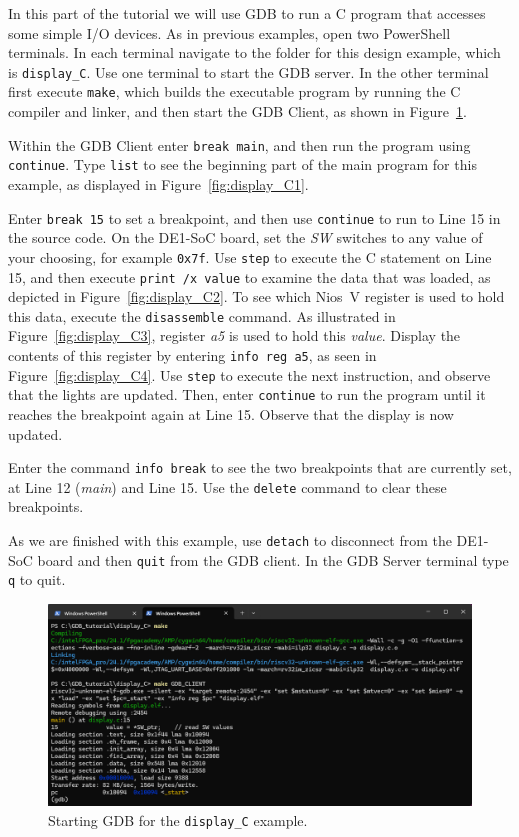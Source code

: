 \documentclass[11pt, twoside, pdftex]{article}
\newcommand{\red}[1]{{\color{red}\sf{#1}}}
\begin{document}
In this part of the tutorial we will use GDB to run a C program that accesses some simple 
I/O devices. As in previous examples, open two PowerShell terminals. In each terminal 
navigate to the folder for this design example, which is \texttt{display\_C}. Use one 
terminal to start the GDB server. In the other terminal first execute \texttt{make}, which 
builds the executable program by running the C compiler and linker, and then start the GDB 
Client, as shown in Figure~\ref{fig:display_C0}.

Within the GDB Client enter \texttt{break main}, and then run the program using \texttt{continue}.
Type \texttt{list} to see the beginning part of the main program for this example, as displayed in 
Figure~\ref{fig:display_C1}.

Enter \texttt{break 15} to set a breakpoint, and then use \texttt{continue} to run to 
Line 15 in the source code. On the DE1-SoC board, set the {\it SW} switches to any value of
your choosing, for example \texttt{0x7f}. Use \texttt{step} to execute the C statement on
Line 15, and then execute \texttt{print /x value} to examine the data that was loaded, as 
depicted in Figure~\ref{fig:display_C2}. To see which Nios~V register is used to hold
this data, execute the \texttt{disassemble} command. As illustrated in 
Figure~\ref{fig:display_C3}, register {\it a5} is used to hold this {\it value}. Display
the contents of this register by entering \texttt{info reg a5}, as seen in 
Figure~\ref{fig:display_C4}. Use \texttt{step} to execute the next instruction, and
observe that the \red{{\it LEDR}} lights are updated. Then, enter \texttt{continue} to run
the program until it reaches the breakpoint again at Line 15. Observe that the 
\red{{\it HEX0}} display is now updated.

Enter the command \texttt{info break} to see the two breakpoints that are currently set,
at Line 12 ({\it main}) and Line 15. Use the \texttt{delete} command to clear these
breakpoints. 

As we are finished with this example, use \texttt{detach} to disconnect from the DE1-SoC 
board and then \texttt{quit} from the GDB client. In the GDB Server terminal type 
\texttt{q} to quit.

\begin{figure}[h]
    \begin{center}
        \includegraphics[scale=.6]{figures/display_C0.png}
        \caption{Starting GDB for the \texttt{display\_C} example.}
        \label{fig:display_C0}
    \end{center}
\end{figure}
\end{document}
